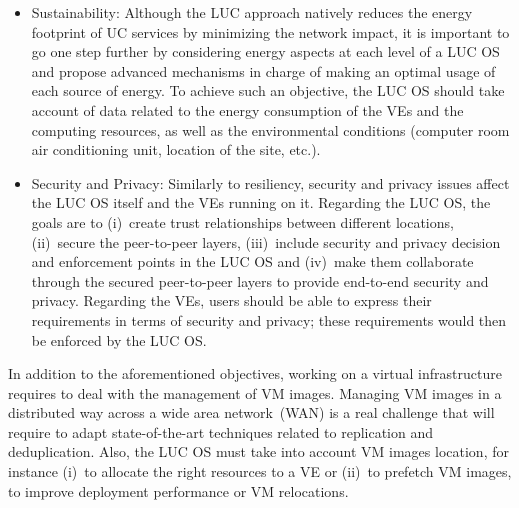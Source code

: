 \begin{itemize}
\item Sustainability: Although the LUC approach natively reduces the energy
footprint of UC services by minimizing the network impact, 
it is important to go one
step further by considering energy aspects at each level of a LUC OS
and propose advanced mechanisms in charge of making an optimal usage of each source of energy. 
 To achieve such an objective, the LUC OS should take account of data related to the energy
  consumption of the VEs  and the computing resources,
  as well as the environmental conditions (computer room air conditioning unit, location of the
  site, etc.).
\item Security and Privacy: Similarly to resiliency, security and privacy issues affect the LUC OS itself and the VEs running on it.
Regarding the LUC OS, the goals are to (i)~create trust relationships between
different locations, (ii)~secure the peer-to-peer layers, 
(iii)~include security and privacy decision and enforcement points in the LUC OS and (iv)~make them collaborate through the secured peer-to-peer layers to provide end-to-end security and privacy. 
Regarding the VEs, users should be able to express their requirements in terms of security and privacy; these requirements would then be enforced by the LUC OS.


\end{itemize}

In addition to the aforementioned objectives, working on a virtual infrastructure 
requires to deal with
the management of VM images. Managing VM images in a distributed
way across a wide area network~(WAN) is a real challenge that will require to adapt
state-of-the-art techniques related to replication and deduplication. Also,
the LUC OS must take into account VM images
location, for instance (i)~to allocate the right resources to a VE  or (ii)~to prefetch
VM images, to improve deployment performance or VM relocations.

